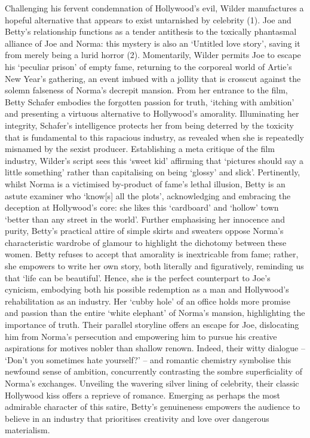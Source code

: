 \documentclass[a4paper]{article}
\begin{document}
Challenging his fervent condemnation of Hollywood’s evil, Wilder manufactures a hopeful alternative that appears to exist untarnished by celebrity (1). Joe and Betty’s relationship functions as a tender antithesis to the toxically phantasmal alliance of Joe and Norma: this mystery is also an ‘Untitled love story’, saving it from merely being a lurid horror (2). Momentarily, Wilder permits Joe to escape his ‘peculiar prison’ of empty fame, returning to the corporeal world of Artie’s New Year’s gathering, an event imbued with a jollity that is crosscut against the solemn falseness of Norma’s decrepit mansion. From her entrance to the film, Betty Schafer embodies the forgotten passion for truth, ‘itching with ambition’ and presenting a virtuous alternative to Hollywood’s amorality. Illuminating her integrity, Schafer’s intelligence protects her from being deterred by the toxicity that is fundamental to this rapacious industry, as revealed when she is repeatedly misnamed by the sexist producer. Establishing a meta critique of the film industry, Wilder’s script sees this ‘sweet kid’ affirming that ‘pictures should say a little something’ rather than capitalising on being ‘glossy’ and slick’. Pertinently, whilst Norma is a victimised by-product of fame’s lethal illusion, Betty is an astute examiner who ‘know[s] all the plots’, acknowledging and embracing the deception at Hollywood’s core: she likes this ‘cardboard’ and ‘hollow’ town ‘better than any street in the world’. Further emphasising her innocence and purity, Betty’s practical attire of simple skirts and sweaters oppose Norma’s characteristic wardrobe of glamour to highlight the dichotomy between these women. Betty refuses to accept that amorality is inextricable from fame; rather, she empowers to write her own story, both literally and figuratively, reminding us that ‘life can be beautiful’. Hence, she is the perfect counterpart to Joe’s cynicism, embodying both his possible redemption as a man and Hollywood’s rehabilitation as an industry. Her ‘cubby hole’ of an office holds more promise and passion than the entire ‘white elephant’ of Norma’s mansion, highlighting the importance of truth. Their parallel storyline offers an escape for Joe, dislocating him from Norma’s persecution and empowering him to pursue his creative aspirations for motives nobler than shallow renown. Indeed, their witty dialogue – ‘Don’t you sometimes hate yourself?’ – and romantic chemistry symbolise this newfound sense of ambition, concurrently contrasting the sombre superficiality of Norma’s exchanges. Unveiling the wavering silver lining of celebrity, their classic Hollywood kiss offers a reprieve of romance. Emerging as perhaps the most admirable character of this satire, Betty’s genuineness empowers the audience to believe in an industry that prioritises creativity and love over dangerous materialism.\\
\end{document}
